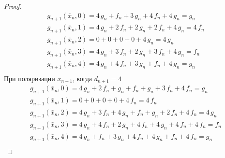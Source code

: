 \documentclass[a4paper, 12pt]{extarticle}
\begin{document}
\begin{proof}
$$\begin{array}{l}
g_{n+1}(\bar{x}_n, 0) = 4\,g_n + f_n + 3\,g_n + 4\,f_n + 4\,g_n = g_n \\
g_{n+1}(\bar{x}_n, 1) = 4\,g_n + 2\,f_n + 2\,g_n + 2\,f_n + 4\,g_n = 4\,f_n \\
g_{n+1}(\bar{x}_n, 2) = 0 + 0 + 0 + 0 + 4\,g_n = 4\,g_n \\
g_{n+1}(\bar{x}_n, 3) = 4\,g_n + 3\,f_n + 2\,g_n + 3\,f_n + 4\,g_n = f_n \\
g_{n+1}(\bar{x}_n, 4) = 4\,g_n + 4\,f_n + 3\,g_n + f_n + 4\,g_n = g_n \\
\end{array}$$
При поляризации $x_{n+1}$, когда $d_{n+1} = 4$
$$\begin{array}{l}
g_{n+1}(\bar{x}_n, 0) = 4\,g_n + 2\,f_n + g_n + f_n + g_n + 3\,f_n + 4\,f_n = g_n \\
g_{n+1}(\bar{x}_n, 1) = 0 + 0 + 0 + 0 + 4\,f_n = 4\,f_n \\
g_{n+1}(\bar{x}_n, 2) = 4\,g_n + 3\,f_n + 4\,g_n + f_n + g_n + 2\,f_n + 4\,f_n = 4\,g_n \\
g_{n+1}(\bar{x}_n, 3) = 4\,g_n + 4\,f_n + 2\,g_n + 4\,f_n + 4\,g_n + 4\,f_n + 4\,f_n = f_n \\
g_{n+1}(\bar{x}_n, 4) = 4\,g_n + f_n + 3\,g_n + 4\,f_n + 4\,g_n + f_n + 4\,f_n = g_n \\
\end{array}$$

\end{proof}
\end{document}
